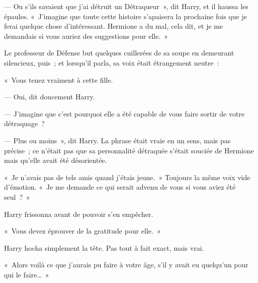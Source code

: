 --- Ou s'ils savaient que j'ai détruit un Détraqueur~», dit Harry, et il haussa les épaules.
«~J'imagine que toute cette histoire s'apaisera la prochaine fois que je ferai quelque chose d'intéressant.
Hermione a du mal, cela dit, et je me demandais si vous auriez des suggestions pour elle.~»

Le professeur de Défense but quelques cuillerées de sa soupe en demeurant silencieux, puis~; et lorsqu'il parla, sa voix était étrangement neutre~:

«~Vous tenez vraiment à cette fille.

--- Oui, dit doucement Harry.

--- J'imagine que c'est pourquoi elle a été capable de vous faire sortir de votre détraquage~?

--- Plus ou moins~», dit Harry.
La phrase était vraie en un sens, mais pas précise~; ce n'était pas que sa personnalité détraquée s'était souciée de Hermione mais qu'elle avait été désorientée.

«~Je n'avais pas de tels amis quand j'étais jeune.~»
Toujours la même voix vide d'émotion.
«~Je me demande ce qui serait advenu de vous si vous aviez été seul~?~»

Harry frissonna avant de pouvoir s'en empêcher.

«~Vous devez éprouver de la gratitude pour elle.~»

Harry hocha simplement la tête.
Pas tout à fait exact, mais vrai.

«~Alors voilà ce que j'aurais pu faire à votre âge, s'il y avait eu quelqu'un pour qui le faire…~»
